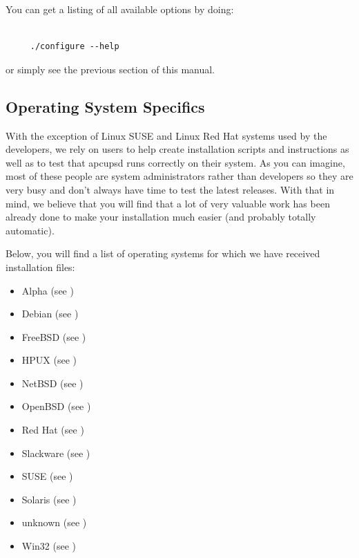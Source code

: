 You can get a listing of all available options by doing: 

\footnotesize
\begin{verbatim}
     
     ./configure --help
\end{verbatim}
\normalsize

or simply see the previous section of this manual. 

\label{Operating-System-Specifics}

\subsection*{Operating System Specifics}

\label{index-OSes-31}
With the exception of Linux SUSE and Linux Red Hat systems used by the
developers, we rely on users to help create installation scripts and
instructions as well as to test that apcupsd runs correctly on their system.
As you can imagine, most of these people are system administrators rather than
developers so they are very busy and don't always have time to test the latest
releases.  With that in mind, we believe that you will find that a lot of very
valuable work has been already done to make your installation much easier (and
probably totally automatic).  

Below, you will find a list of operating systems for which we have received
installation files:  

\begin{itemize}
\item Alpha (see 
   )  
\item Debian (see 
   )  
\item FreeBSD (see 
   )  
\item HPUX (see 
   )  
\item NetBSD (see 
   )  
\item OpenBSD (see 
   )  
\item Red Hat (see 
   )  
\item Slackware (see 
   )  
\item SUSE (see 
   )  
\item Solaris (see 
   )  
\item unknown (see 
   )  
\item Win32 (see 
   ) 
\end{itemize}

